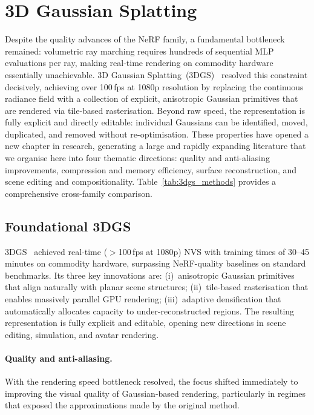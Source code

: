 \section{3D Gaussian Splatting}
\label{sec:3dgs}

Despite the quality advances of the NeRF family, a fundamental bottleneck
remained: volumetric ray marching requires hundreds of sequential MLP
evaluations per ray, making real-time rendering on commodity hardware essentially
unachievable.
3D Gaussian Splatting~(3DGS)~\citep{kerbl2023gaussian} resolved this constraint
decisively, achieving over 100\,fps at 1080p resolution by replacing the
continuous radiance field with a collection of explicit, anisotropic Gaussian
primitives that are rendered via tile-based rasterisation.
Beyond raw speed, the representation is fully explicit and directly editable:
individual Gaussians can be identified, moved, duplicated, and removed without
re-optimisation.
These properties have opened a new chapter in \nvs{} research, generating a
large and rapidly expanding literature that we organise here into four
thematic directions: quality and anti-aliasing improvements, compression and
memory efficiency, surface reconstruction, and scene editing and compositionality.
Table~\ref{tab:3dgs_methods} provides a comprehensive cross-family comparison.

\subsection{Foundational 3DGS}

3DGS~\citep{kerbl2023gaussian} achieved real-time ($>$100\,fps at 1080p)
NVS with training times of 30--45 minutes on commodity hardware,
surpassing NeRF-quality baselines on standard benchmarks.
Its three key innovations are:
(i)~anisotropic Gaussian primitives that align naturally with planar scene
structures;
(ii)~tile-based rasterisation that enables massively parallel GPU rendering;
(iii)~adaptive densification that automatically allocates capacity to
under-reconstructed regions.
The resulting representation is fully explicit and editable, opening new
directions in scene editing, simulation, and avatar rendering.

\paragraph{Quality and anti-aliasing.}
With the rendering speed bottleneck resolved, the focus shifted immediately
to improving the visual quality of Gaussian-based rendering, particularly in
regimes that exposed the approximations made by the original method.

